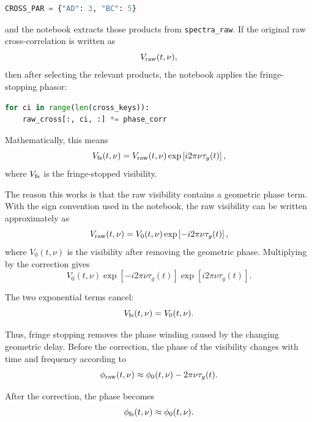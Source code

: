 \documentclass[12pt]{extarticle}
\begin{document}
\begin{lstlisting}[language=Python]
CROSS_PAR = {"AD": 3, "BC": 5}
\end{lstlisting}

and the notebook extracts those products from \texttt{spectra\_raw}. If the original raw cross-correlation is written as
\begin{equation}
V_{\rm raw}(t,\nu),
\end{equation}
then after selecting the relevant products, the notebook applies the fringe-stopping phasor:

\begin{lstlisting}[language=Python]
for ci in range(len(cross_keys)):
    raw_cross[:, ci, :] *= phase_corr
\end{lstlisting}

Mathematically, this means
\begin{equation}
V_{\rm fs}(t,\nu) = V_{\rm raw}(t,\nu)\exp\left[i2\pi \nu \tau_g(t)\right],
\end{equation}
where $V_{\rm fs}$ is the fringe-stopped visibility.

The reason this works is that the raw visibility contains a geometric phase term. With the sign convention used in the notebook, the raw visibility can be written approximately as
\begin{equation}
V_{\rm raw}(t,\nu) = V_0(t,\nu)\exp\left[-i2\pi \nu \tau_g(t)\right],
\end{equation}
where $V_0(t,\nu)$ is the visibility after removing the geometric phase. Multiplying by the correction gives
\begin{equation}
V_0(t,\nu)\exp\left[-i2\pi \nu \tau_g(t)\right]\exp\left[i2\pi \nu \tau_g(t)\right].
\end{equation}

The two exponential terms cancel:
\begin{equation}
V_{\rm fs}(t,\nu) = V_0(t,\nu).
\end{equation}

Thus, fringe stopping removes the phase winding caused by the changing geometric delay. Before the correction, the phase of the visibility changes with time and frequency according to
\begin{equation}
\phi_{\rm raw}(t,\nu) \approx \phi_0(t,\nu) - 2\pi \nu \tau_g(t).
\end{equation}

After the correction, the phase becomes
\begin{equation}
\phi_{\rm fs}(t,\nu) \approx \phi_0(t,\nu).
\end{equation}
\end{document}

